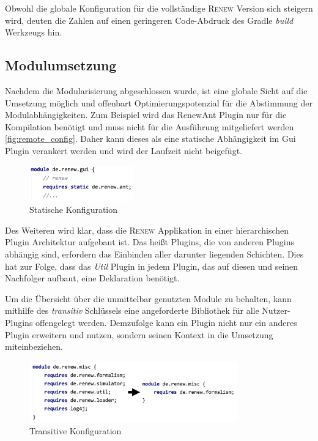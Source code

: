 	Obwohl die globale Konfiguration für die vollständige \textsc{Renew} Version sich steigern wird, deuten die Zahlen auf einen geringeren Code-Abdruck des Gradle \textit{build} Werkzeugs hin.\bigbreak

\subsection{Modulumsetzung} \label{sub:optimierung}%
	Nachdem die Modularisierung abgeschlossen wurde, ist eine globale Sicht auf die Umsetzung möglich und offenbart Optimierungspotenzial für die Abstimmung der Modulabhängigkeiten. Zum Beispiel wird das RenewAnt Plugin nur für die Kompilation benötigt und muss nicht für die Ausführung mitgeliefert werden \ref{fig:remote_config}. Daher kann dieses als eine statische Abhängigkeit im Gui Plugin verankert werden und wird der Laufzeit nicht beigefügt.\bigbreak

	\begin{figure}[h!]
	  \centering
	  \includegraphics[width=0.4\textwidth]{material/images/gui_config.png}
	  \caption{Statische Konfiguration}
	  \label{fig:gui_config}
	\end{figure}

	Des Weiteren wird klar, dass die \textsc{Renew} Applikation in einer hierarchischen Plugin Architektur aufgebaut ist. Das heißt Plugins, die von anderen Plugins abhängig sind, erfordern das Einbinden aller darunter liegenden Schichten. Dies hat zur Folge, dass das \textit{Util} Plugin in jedem Plugin, das auf diesen und seinen Nachfolger aufbaut, eine Deklaration benötigt. \newline

	Um die Übersicht über die unmittelbar genutzten Module zu behalten, kann mithilfe des \textit{transitiv}  Schlüssels eine angeforderte Bibliothek für alle Nutzer-Plugins offengelegt werden. Demzufolge kann ein Plugin nicht nur ein anderes Plugin erweitern und nutzen, sondern seinen Kontext in die Umsetzung miteinbeziehen. \bigbreak

	\begin{figure}[h!]
	  \centering
	  \includegraphics[width=0.8\textwidth]{material/images/misc_trans.png}
	  \caption{Transitive Konfiguration}
	  \label{fig:trans_config}
	\end{figure}

